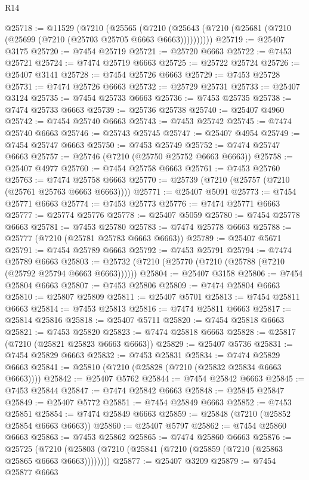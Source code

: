 \begin{lexlean}{R14}
\begin{coremodule}
{{{{{{{{{{{{{{{{{{{{{{{{{{{{{{{{{{{{{{{{{{{{{{{{{{{{{{{{{{{{{{{{{{{{{{{{{{{{{{{{{{@25718 := @11529
    (@7210
      (@25565
        (@7210 (@25643 (@7210 (@25681 (@7210 (@25699 (@7210 (@25703 @25705 @6663 @6663))))))))))
@25719 := @25407 @3175
@25720 := @7454 @25719
@25721 := @25720 @6663
@25722 := @7453 @25721
@25724 := @7474 @25719 @6663
@25725 := @25722 @25724
@25726 := @25407 @3141
@25728 := @7454 @25726 @6663
@25729 := @7453 @25728
@25731 := @7474 @25726 @6663
@25732 := @25729 @25731
@25733 := @25407 @3124
@25735 := @7454 @25733 @6663
@25736 := @7453 @25735
@25738 := @7474 @25733 @6663
@25739 := @25736 @25738
@25740 := @25407 @4960
@25742 := @7454 @25740 @6663
@25743 := @7453 @25742
@25745 := @7474 @25740 @6663
@25746 := @25743 @25745
@25747 := @25407 @4954
@25749 := @7454 @25747 @6663
@25750 := @7453 @25749
@25752 := @7474 @25747 @6663
@25757 := @25746 (@7210 (@25750 @25752 @6663 @6663))
@25758 := @25407 @4977
@25760 := @7454 @25758 @6663
@25761 := @7453 @25760
@25763 := @7474 @25758 @6663
@25770 := @25739 (@7210 (@25757 (@7210 (@25761 @25763 @6663 @6663))))
@25771 := @25407 @5091
@25773 := @7454 @25771 @6663
@25774 := @7453 @25773
@25776 := @7474 @25771 @6663
@25777 := @25774 @25776
@25778 := @25407 @5059
@25780 := @7454 @25778 @6663
@25781 := @7453 @25780
@25783 := @7474 @25778 @6663
@25788 := @25777 (@7210 (@25781 @25783 @6663 @6663))
@25789 := @25407 @5671
@25791 := @7454 @25789 @6663
@25792 := @7453 @25791
@25794 := @7474 @25789 @6663
@25803 := @25732 (@7210 (@25770 (@7210 (@25788 (@7210 (@25792 @25794 @6663 @6663))))))
@25804 := @25407 @3158
@25806 := @7454 @25804 @6663
@25807 := @7453 @25806
@25809 := @7474 @25804 @6663
@25810 := @25807 @25809
@25811 := @25407 @5701
@25813 := @7454 @25811 @6663
@25814 := @7453 @25813
@25816 := @7474 @25811 @6663
@25817 := @25814 @25816
@25818 := @25407 @5711
@25820 := @7454 @25818 @6663
@25821 := @7453 @25820
@25823 := @7474 @25818 @6663
@25828 := @25817 (@7210 (@25821 @25823 @6663 @6663))
@25829 := @25407 @5736
@25831 := @7454 @25829 @6663
@25832 := @7453 @25831
@25834 := @7474 @25829 @6663
@25841 := @25810 (@7210 (@25828 (@7210 (@25832 @25834 @6663 @6663))))
@25842 := @25407 @5762
@25844 := @7454 @25842 @6663
@25845 := @7453 @25844
@25847 := @7474 @25842 @6663
@25848 := @25845 @25847
@25849 := @25407 @5772
@25851 := @7454 @25849 @6663
@25852 := @7453 @25851
@25854 := @7474 @25849 @6663
@25859 := @25848 (@7210 (@25852 @25854 @6663 @6663))
@25860 := @25407 @5797
@25862 := @7454 @25860 @6663
@25863 := @7453 @25862
@25865 := @7474 @25860 @6663
@25876 := @25725
    (@7210 (@25803 (@7210 (@25841 (@7210 (@25859 (@7210 (@25863 @25865 @6663 @6663))))))))
@25877 := @25407 @3209
@25879 := @7454 @25877 @6663
}}}}}}}}}}}}}}}}}}}}}}}}}}}}}}}}}}}}}}}}}}}}}}}}}}}}}}}}}}}}}}}}}}}}}}}}}}}}}}}}}}
\end{coremodule}
\end{lexlean}
